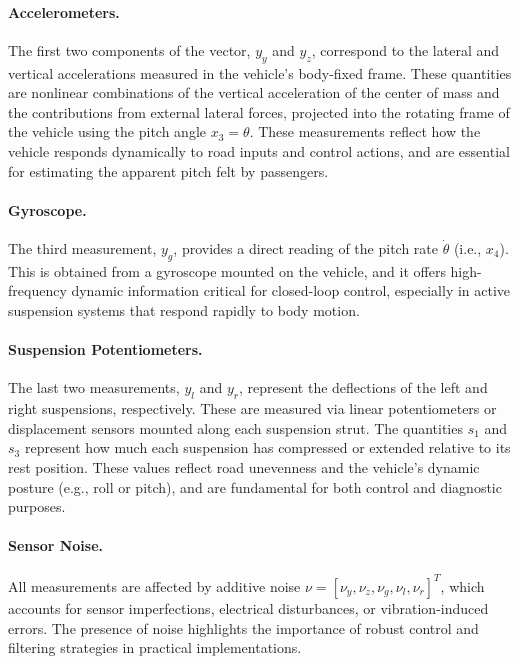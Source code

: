 \documentclass[]{report}
\begin{document}
\paragraph{Accelerometers.}
The first two components of the vector, $y_y$ and $y_z$, correspond to the lateral and vertical accelerations measured in the vehicle's body-fixed frame. These quantities are nonlinear combinations of the vertical acceleration of the center of mass and the contributions from external lateral forces, projected into the rotating frame of the vehicle using the pitch angle $x_3 = \theta$. These measurements reflect how the vehicle responds dynamically to road inputs and control actions, and are essential for estimating the apparent pitch felt by passengers.

\paragraph{Gyroscope.}
The third measurement, $y_g$, provides a direct reading of the pitch rate $\dot{\theta}$ (i.e., $x_4$). This is obtained from a gyroscope mounted on the vehicle, and it offers high-frequency dynamic information critical for closed-loop control, especially in active suspension systems that respond rapidly to body motion.

\paragraph{Suspension Potentiometers.}
The last two measurements, $y_l$ and $y_r$, represent the deflections of the left and right suspensions, respectively. These are measured via linear potentiometers or displacement sensors mounted along each suspension strut. The quantities $s_1$ and $s_3$ represent how much each suspension has compressed or extended relative to its rest position. These values reflect road unevenness and the vehicle's dynamic posture (e.g., roll or pitch), and are fundamental for both control and diagnostic purposes.

\paragraph{Sensor Noise.}
All measurements are affected by additive noise $\nu = [\nu_y, \nu_z, \nu_g, \nu_l, \nu_r]^T$, which accounts for sensor imperfections, electrical disturbances, or vibration-induced errors. The presence of noise highlights the importance of robust control and filtering strategies in practical implementations.
\end{document}
